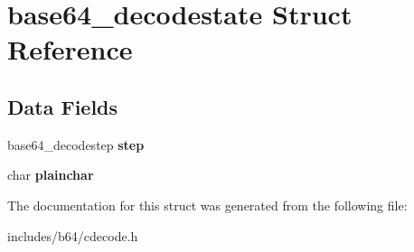 \hypertarget{structbase64__decodestate}{\section{base64\-\_\-decodestate Struct Reference}
\label{structbase64__decodestate}
}
\subsection*{Data Fields}
\begin{DoxyCompactItemize}
\item 
\hypertarget{structbase64__decodestate_a448927d59479ddab147ed380104d2cbe}{base64\-\_\-decodestep {\bfseries step}}\label{structbase64__decodestate_a448927d59479ddab147ed380104d2cbe}

\item 
\hypertarget{structbase64__decodestate_ad1b3e9f303925389dcd09100288913d4}{char {\bfseries plainchar}}\label{structbase64__decodestate_ad1b3e9f303925389dcd09100288913d4}

\end{DoxyCompactItemize}


The documentation for this struct was generated from the following file\-:\begin{DoxyCompactItemize}
\item 
includes/b64/cdecode.\-h\end{DoxyCompactItemize}
